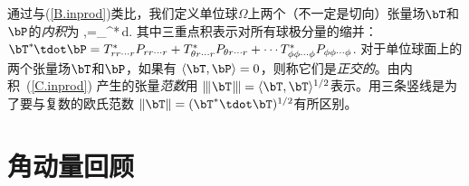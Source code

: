通过与(\ref{B.inprod})类比，我们定义单位球$\Omega$上两个（不一定是切向）张量场$\bT$和
$\bP$的{\em 内积\/}为
%
\eq
\label{C.inprod}
\langle\bT,\bP\rangle=\int_\Omega \bT^*\hspace{-0.2 mm}\tdot\bP\,d\Om.
\en
其中三重点积表示对所有球极分量的缩并：
$\bT^*\hspace{-0.2 mm}\tdot\bP=T^*_{rr\cdots r}P_{rr\cdots r}+
T^*_{\theta r\cdots r}P_{\theta r\cdots r}+\cdots
T^*_{\phi\phi\cdots\phi}P_{\phi\phi\cdots\phi}$.
对于单位球面上的两个张量场$\bT$和$\bP$，如果有 $\langle\bT,\bP\rangle=0$，则称它们是{\em 正交的\/}。由内积~(\ref{C.inprod}) 产生的张量{\em 范数\/}用
$\|\hspace{-0.3 mm}|\hspace{0.2 mm}\bT\hspace{0.2 mm}\|\hspace{-0.3 mm}|
=\langle\bT,\bT\rangle^{1/2}$表示。用三条竖线是为了要与复数的欧氏范数 $\|\bT\|=(\bT^*\tdot\bT)^{1/2}$有所区别。

\section{角动量回顾}
%
\label{section:rotations}

